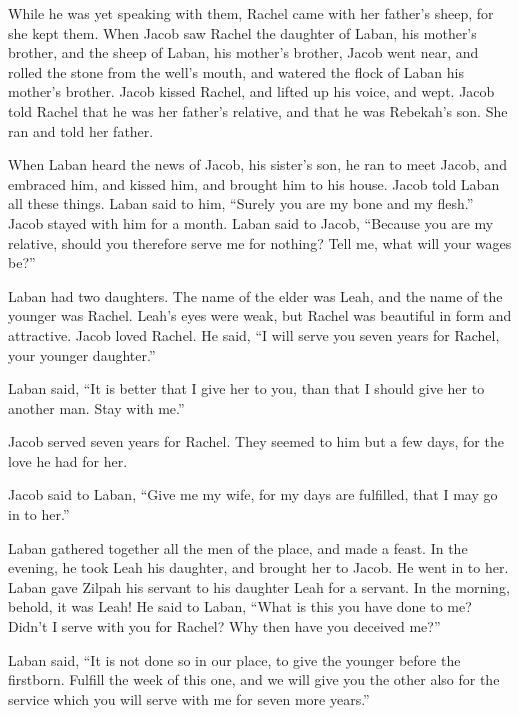  While he was yet speaking with them, Rachel came with her
father's sheep, for she kept them.  When Jacob saw Rachel
the daughter of Laban, his mother's brother, and the sheep of Laban, his
mother's brother, Jacob went near, and rolled the stone from the well's
mouth, and watered the flock of Laban his mother's brother.
 Jacob kissed Rachel, and lifted up his voice, and wept.
 Jacob told Rachel that he was her father's relative, and
that he was Rebekah's son. She ran and told her father.

 When Laban heard the news of Jacob, his sister's son, he
ran to meet Jacob, and embraced him, and kissed him, and brought him to
his house. Jacob told Laban all these things.  Laban said
to him, ``Surely you are my bone and my flesh.'' Jacob stayed with him
for a month.  Laban said to Jacob, ``Because you are my
relative, should you therefore serve me for nothing? Tell me, what will
your wages be?''

 Laban had two daughters. The name of the elder was Leah,
and the name of the younger was Rachel.  Leah's eyes were
weak, but Rachel was beautiful in form and attractive. 
Jacob loved Rachel. He said, ``I will serve you seven years for Rachel,
your younger daughter.''

 Laban said, ``It is better that I give her to you, than
that I should give her to another man. Stay with me.''

 Jacob served seven years for Rachel. They seemed to him
but a few days, for the love he had for her.

 Jacob said to Laban, ``Give me my wife, for my days are
fulfilled, that I may go in to her.''

 Laban gathered together all the men of the place, and made
a feast.  In the evening, he took Leah his daughter, and
brought her to Jacob. He went in to her.  Laban gave Zilpah
his servant to his daughter Leah for a servant.  In the
morning, behold, it was Leah! He said to Laban, ``What is this you have
done to me? Didn't I serve with you for Rachel? Why then have you
deceived me?''

 Laban said, ``It is not done so in our place, to give the
younger before the firstborn.  Fulfill the week of this
one, and we will give you the other also for the service which you will
serve with me for seven more years.''


